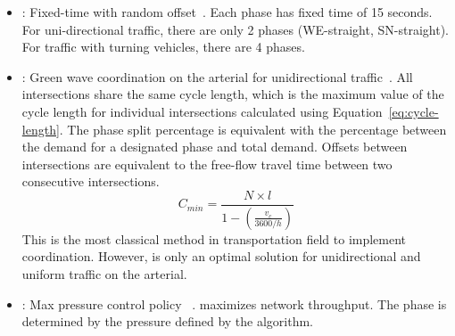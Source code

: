 \begin{itemize}[wide,noitemsep,topsep=0pt]

\item \textbf{\FT}: Fixed-time with random offset~\cite{Roess2011t}. Each phase has fixed time of 15 seconds. For uni-directional traffic, there are only 2 phases (WE-straight, SN-straight). For traffic with turning vehicles, there are 4 phases. 



\item \textbf{\Greenwave}: Green wave coordination on the arterial for unidirectional traffic~\cite{Roess2011t}. All intersections share the same cycle length, which is the maximum value of the cycle length for individual intersections calculated using Equation~\ref{eq:cycle-length}. The phase split percentage is equivalent with the percentage between the demand for a designated phase and total demand. Offsets between intersections are equivalent to the free-flow travel time between two consecutive intersections. %
\begin{equation}
\label{eq:cycle-length}
C_{min}=\frac{N\times{l}}{1-(\frac{v_c}{3600/h})}
\end{equation}
This is the most classical method in transportation field to implement coordination. However, \Greenwave is only an optimal solution for unidirectional and uniform traffic on the arterial. 

\item \textbf{\Maxpressure}: Max pressure control policy ~\cite{varaiya2013max}. \Maxpressure maximizes network throughput. The phase is determined by the pressure defined by the algorithm.


\end{itemize}
